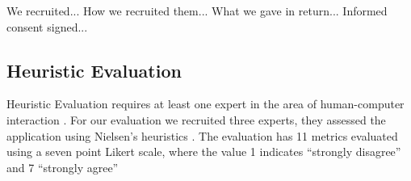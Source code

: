 \documentclass[twocolumn]{bmcart}%
\begin{document}
We recruited...
How we recruited them...
What we gave in return...
Informed consent signed...

\subsection*{Heuristic Evaluation}

Heuristic Evaluation requires at least one expert in the area of human-computer interaction \cite{nielsen1994usability, johnson2011ehr}. For our evaluation we recruited three experts, they assessed the application using Nielsen's heuristics \cite{nielsen1994usability}. The evaluation has 11 metrics evaluated using a seven point Likert scale, where the value 1 indicates ``strongly disagree'' and 7 ``strongly agree''

\end{document}
